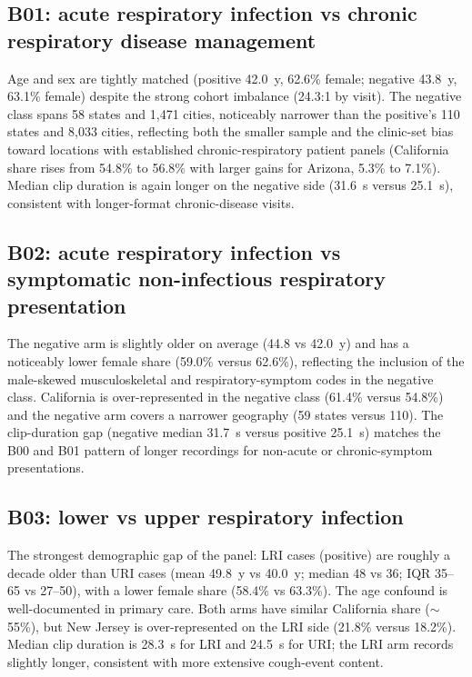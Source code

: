 \documentclass[utf8]{frontiers_suppmat} %
\begin{document}
\subsection{B01: acute respiratory infection vs chronic respiratory disease management}

Age and sex are tightly matched (positive 42.0~y, 62.6\% female;
negative 43.8~y, 63.1\% female) despite the strong cohort imbalance
(24.3:1 by visit). The negative class spans 58 states and 1{,}471
cities, noticeably narrower than the positive's 110 states and
8{,}033 cities, reflecting both the smaller sample and the
clinic-set bias toward locations with established chronic-respiratory
patient panels (California share rises from 54.8\% to 56.8\% with
larger gains for Arizona, 5.3\% to 7.1\%). Median clip duration is
again longer on the negative side (31.6~s versus 25.1~s), consistent
with longer-format chronic-disease visits.

\subsection{B02: acute respiratory infection vs symptomatic non-infectious respiratory presentation}

The negative arm is slightly older on average (44.8 vs 42.0~y) and
has a noticeably lower female share (59.0\% versus 62.6\%),
reflecting the inclusion of the male-skewed musculoskeletal and
respiratory-symptom codes in the negative class. California is
over-represented in the negative class (61.4\% versus 54.8\%) and
the negative arm covers a narrower geography (59 states versus 110).
The clip-duration gap (negative median 31.7~s versus positive 25.1~s)
matches the B00 and B01 pattern of longer recordings for non-acute
or chronic-symptom presentations.

\subsection{B03: lower vs upper respiratory infection}

The strongest demographic gap of the panel: LRI cases (positive)
are roughly a decade older than URI cases (mean 49.8~y vs 40.0~y;
median 48 vs 36; IQR 35--65 vs 27--50), with a lower female share
(58.4\% vs 63.3\%). The age confound is well-documented in primary
care. Both
arms have similar California share ($\sim$55\%), but New Jersey is
over-represented on the LRI side (21.8\% versus 18.2\%). Median
clip duration is 28.3~s for LRI and 24.5~s for URI; the LRI arm
records slightly longer, consistent with more extensive cough-event
content.
\end{document}
